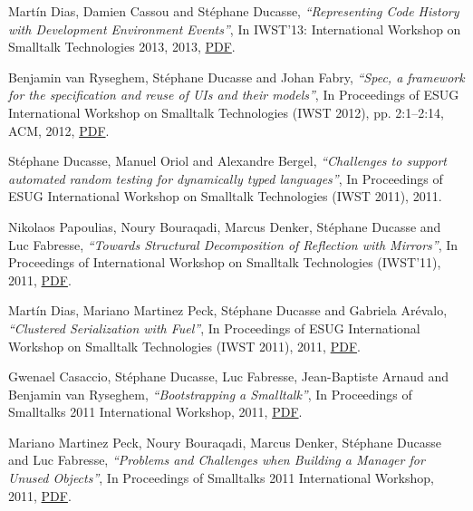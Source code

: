 \documentclass{article}
\newcommand{\czauthors}[1]{#1}
\newcommand{\cztitle}[1]{\emph{``#1''}}
\newcommand{\czbooktitle}[1]{#1}
\begin{document}
\begin{itemize}
	\pub  \czauthors{Mart\'in Dias, Damien Cassou and St\'ephane Ducasse},  \cztitle{Representing Code History with Development Environment Events},  In \czbooktitle{IWST'13: International Workshop on Smalltalk Technologies 2013}, 2013, \href{http://rmod-files.lille.inria.fr/Team/Texts/Papers/Dias13a-IWST13-Epicea.pdf}{PDF}.

	\pub  \czauthors{Benjamin van Ryseghem, St\'ephane Ducasse and Johan Fabry},  \cztitle{Spec, a framework for the specification and reuse of UIs and their models},  In \czbooktitle{Proceedings of ESUG International Workshop on Smalltalk Technologies (IWST 2012)}, pp. 2:1--2:14, ACM, 2012, \href{http://rmod-files.lille.inria.fr/Team/Texts/Papers/Ryse12b-Spec-IWST12-Final.pdf}{PDF}.

	\pub  \czauthors{St\'ephane Ducasse, Manuel Oriol and Alexandre Bergel},  \cztitle{Challenges to support automated random testing for dynamically typed languages},  In \czbooktitle{Proceedings of ESUG International Workshop on Smalltalk Technologies (IWST 2011)}, 2011.

	\pub  \czauthors{Nikolaos Papoulias, Noury Bouraqadi, Marcus Denker, St\'ephane Ducasse and Luc Fabresse},  \cztitle{Towards Structural Decomposition of Reflection with Mirrors},  In \czbooktitle{{Proceedings of International Workshop on Smalltalk Technologies (IWST'11)}}, 2011, \href{http://rmod-files.lille.inria.fr/Team/Texts/Papers/Papo11a-StructuralDecomposition.pdf}{PDF}.

	\pub  \czauthors{Mart\'in Dias, Mariano Martinez Peck, St\'ephane Ducasse and Gabriela Ar\'evalo},  \cztitle{Clustered Serialization with {Fuel}},  In \czbooktitle{Proceedings of ESUG International Workshop on Smalltalk Technologies (IWST 2011)}, 2011, \href{http://rmod-files.lille.inria.fr/Team/Texts/Papers/Dia11a-IWST11-Fuel.pdf}{PDF}.

	\pub  \czauthors{Gwenael Casaccio, St\'ephane Ducasse, Luc Fabresse, Jean-Baptiste Arnaud and Benjamin van Ryseghem},  \cztitle{Bootstrapping a Smalltalk},  In \czbooktitle{Proceedings of Smalltalks 2011 International Workshop}, 2011, \href{http://rmod-files.lille.inria.fr/Team/Texts/Papers/Casa11a-Smalltalks-BootstrappingASmalltalk.pdf}{PDF}.

	\pub  \czauthors{Mariano Martinez Peck, Noury Bouraqadi, Marcus Denker, St\'ephane Ducasse and Luc Fabresse},  \cztitle{Problems and Challenges when Building a Manager for Unused Objects},  In \czbooktitle{Proceedings of Smalltalks 2011 International Workshop}, 2011, \href{http://rmod-files.lille.inria.fr/Team/Texts/Papers/Mart11b-Smalltalks2011-UOM.pdf}{PDF}.


\end{itemize}
\end{document}
